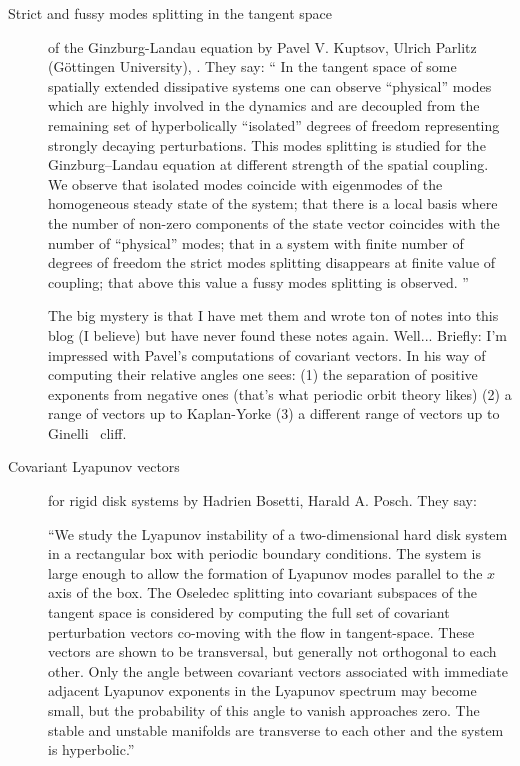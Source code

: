 \begin{description}
\item[Strict and fussy modes splitting in the tangent space]
of the Ginzburg-Landau equation
by Pavel V. Kuptsov, Ulrich Parlitz (G\"{o}ttingen University),
. They say:
``
In the tangent space of some spatially extended dissipative
systems one can observe ``physical'' modes which are highly
involved in the dynamics and are decoupled from the remaining set
of hyperbolically ``isolated'' degrees of freedom representing
strongly decaying perturbations. This modes splitting is studied
for the Ginzburg--Landau equation at different strength of the
spatial coupling. We observe that isolated modes coincide with
eigenmodes of the homogeneous steady state of the system; that
there is a local basis where the number of non-zero components of
the state vector coincides with the number of ``physical'' modes;
that in a system with finite number of degrees of freedom the
strict modes splitting disappears at finite value of coupling;
that above this value a fussy modes splitting is observed.
''

The big mystery is that I have met them and wrote ton of notes into
this blog (I believe) but have never found these notes again. Well...
Briefly: I'm impressed with Pavel's computations of covariant vectors.
In his way of computing their relative angles one sees: (1) the separation
of positive exponents from negative ones (that's what periodic orbit theory likes)
(2) a range of vectors up to Kaplan-Yorke (3) a different range of vectors
up to Ginelli \etal\ cliff.

\item[Covariant Lyapunov vectors] for rigid disk systems
by Hadrien Bosetti, Harald A. Posch. They say:

``We study
the Lyapunov instability of a two-dimensional hard disk
system in a rectangular box with periodic boundary
conditions. The system is large enough to allow the
formation of Lyapunov modes parallel to the $x$ axis of the
box. The Oseledec splitting into covariant subspaces of
the tangent space is considered by computing the full set
of covariant perturbation vectors co-moving with the flow
in tangent-space. These vectors are shown to be
transversal, but generally not orthogonal to each other.
Only the angle between covariant vectors associated with
immediate adjacent Lyapunov exponents in the Lyapunov
spectrum may become small, but the probability of this
angle to vanish approaches zero. The stable and unstable
manifolds are transverse to each other and the system is
hyperbolic.''


\end{description}
